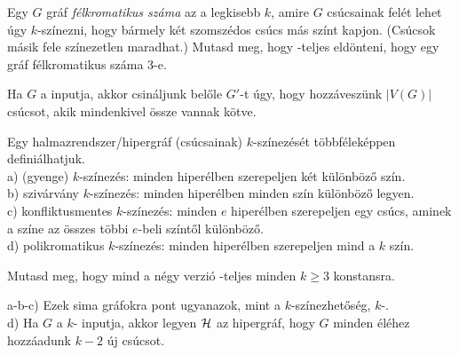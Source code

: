 \begin{Exercise}[counter={sorszam}, difficulty=0]
	Egy $G$ gr\'af \emph{f\'elkromatikus sz\'ama} az a legkisebb $k$, amire $G$ cs\'ucsainak fel\'et lehet \'ugy $k$-sz\'inezni, hogy b\'armely k\'et szomsz\'edos cs\'ucs m\'as sz\'int kapjon. (Cs\'ucsok m\'asik fele sz\'inezetlen maradhat.) Mutasd meg, hogy \NP-teljes eld\"onteni, hogy egy gr\'af f\'elkromatikus sz\'ama 3-e.
\end{Exercise}	
\begin{Answer}
	Ha $G$ a  inputja, akkor csin\'aljunk bel\H ole $G'$-t \'ugy, hogy hozz\'avesz\"unk $|V(G)|$ cs\'ucsot, akik mindenkivel \"ossze vannak k\"otve.
\end{Answer}

\bigskip
{} Egy halmazrendszer/hipergr\'af (cs\'ucsainak) $k$-sz\'inez\'es\'et t\"obbf\'elek\'eppen defini\'alhatjuk.\\
a) (gyenge) $k$-sz\'inez\'es: minden hiper\'elben szerepeljen k\'et k\"ul\"onb\"oz\H o sz\'in.\\
b) sziv\'arv\'any $k$-sz\'inez\'es: minden hiper\'elben minden sz\'in k\"ul\"onb\"oz\H o legyen.\\
c) konfliktusmentes $k$-sz\'inez\'es: minden $e$ hiper\'elben szerepeljen egy cs\'ucs, aminek a sz\'ine az \"osszes t\"obbi $e$-beli sz\'int\H ol k\"ul\"onb\"oz\H o.\\
d) polikromatikus $k$-sz\'inez\'es: minden hiper\'elben szerepeljen mind a $k$ sz\'in.

\begin{Exercise}[counter={sorszam}, difficulty=0]
	Mutasd meg, hogy mind a n\'egy verzi\'o \NP-teljes minden $k\ge 3$ konstansra.
\end{Exercise}	
\begin{Answer}
	a-b-c) Ezek sima gr\'afokra pont ugyanazok, mint a $k$-sz\'inezhet\H os\'eg, $k$-.\\
	d) Ha $G$ a $k$- inputja, akkor legyen $\mathcal{H}$ az  hipergr\'af, hogy $G$ minden \'el\'ehez hozz\'aadunk $k-2$ \'uj cs\'ucsot.
\end{Answer}

